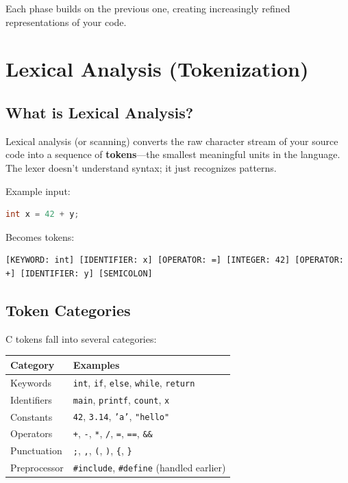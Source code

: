 Each phase builds on the previous one, creating increasingly refined representations of your code.

\section{Lexical Analysis (Tokenization)}

\subsection{What is Lexical Analysis?}

Lexical analysis (or scanning) converts the raw character stream of your source code into a sequence of \textbf{tokens}—the smallest meaningful units in the language. The lexer doesn't understand syntax; it just recognizes patterns.

Example input:
\begin{lstlisting}[language=C]
int x = 42 + y;
\end{lstlisting}

Becomes tokens:
\begin{verbatim}
[KEYWORD: int] [IDENTIFIER: x] [OPERATOR: =] [INTEGER: 42] [OPERATOR: +] [IDENTIFIER: y] [SEMICOLON]
\end{verbatim}

\subsection{Token Categories}

C tokens fall into several categories:

\begin{tabular}{|l|l|}
\hline
\textbf{Category} & \textbf{Examples} \\
\hline
Keywords & \texttt{int}, \texttt{if}, \texttt{else}, \texttt{while}, \texttt{return} \\
\hline
Identifiers & \texttt{main}, \texttt{printf}, \texttt{count}, \texttt{x} \\
\hline
Constants & \texttt{42}, \texttt{3.14}, \texttt{'a'}, \texttt{"hello"} \\
\hline
Operators & \texttt{+}, \texttt{-}, \texttt{*}, \texttt{/}, \texttt{=}, \texttt{==}, \texttt{\&\&} \\
\hline
Punctuation & \texttt{;}, \texttt{,}, \texttt{(}, \texttt{)}, \texttt{\{}, \texttt{\}} \\
\hline
Preprocessor & \texttt{\#include}, \texttt{\#define} (handled earlier) \\
\hline
\end{tabular}

